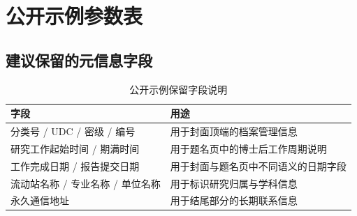\chapter{公开示例参数表}

\section{建议保留的元信息字段}

\begin{longtable}{@{}p{}p{}@{}}
  \caption{公开示例保留字段说明}
  \label{tab:appendix-fields}\\
  \toprule
  字段 & 用途 \\
  \midrule
  分类号 / UDC / 密级 / 编号 & 用于封面顶端的档案管理信息 \\
  研究工作起始时间 / 期满时间 & 用于题名页中的博士后工作周期说明 \\
  工作完成日期 / 报告提交日期 & 用于封面与题名页中不同语义的日期字段 \\
  流动站名称 / 专业名称 / 单位名称 & 用于标识研究归属与学科信息 \\
  永久通信地址 & 用于结尾部分的长期联系信息 \\
  \bottomrule
\end{longtable}
